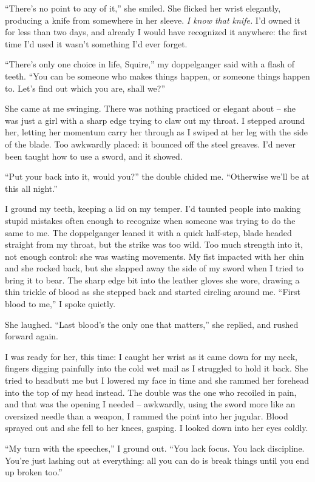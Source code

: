 \documentclass[12pt, openany]{book}
\begin{document}
“There’s no point to any of it,” she smiled. She flicked her wrist elegantly, producing a knife from somewhere in her sleeve. \textit{I know that knife.} I’d owned it for less than two days, and already I would have recognized it anywhere: the first time I’d used it wasn’t something I’d ever forget. 

“There’s only one choice in life, Squire,” my doppelganger said with a flash of teeth. “You can be someone who makes things happen, or someone things happen to. Let’s find out which you are, shall we?”

She came at me swinging. There was nothing practiced or elegant about – she was just a girl with a sharp edge trying to claw out my throat. I stepped around her, letting her momentum carry her through as I swiped at her leg with the side of the blade. Too awkwardly placed: it bounced off the steel greaves. I’d never been taught how to use a sword, and it showed.

“Put your back into it, would you?” the double chided me. “Otherwise we’ll be at this all night.”

I ground my teeth, keeping a lid on my temper. I’d taunted people into making stupid mistakes often enough to recognize when someone was trying to do the same to me. The doppelganger leaned it with a quick half-step, blade headed straight from my throat, but the strike was too wild. Too much strength into it, not enough control: she was wasting movements. My fist impacted with her chin and she rocked back, but she slapped away the side of my sword when I tried to bring it to bear. The sharp edge bit into the leather gloves she wore, drawing a thin trickle of blood as she stepped back and started circling around me. “First blood to me,” I spoke quietly.

She laughed. “Last blood’s the only one that matters,” she replied, and rushed forward again.

I was ready for her, this time: I caught her wrist as it came down for my neck, fingers digging painfully into the cold wet mail as I struggled to hold it back. She tried to headbutt me but I lowered my face in time and she rammed her forehead into the top of my head instead. The double was the one who recoiled in pain, and that was the opening I needed – awkwardly, using the sword more like an oversized needle than a weapon, I rammed the point into her jugular. Blood sprayed out and she fell to her knees, gasping. I looked down into her eyes coldly.

“My turn with the speeches,” I ground out. “You lack focus. You lack discipline. You’re just lashing out at everything: all you can do is break things until you end up broken too.”
\end{document}
